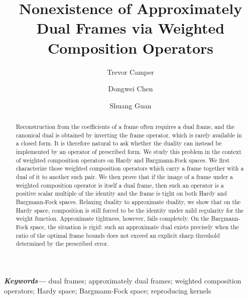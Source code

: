 \documentclass{amsart}
\providecommand{\keywords}[1]{%
  \small
  \textbf{\textit{Keywords---}} #1
}
\theoremstyle{definition}
\theoremstyle{remark}
\numberwithin{equation}{section}
\begin{document}
\title[Nonexistence of Dual Frames]{Nonexistence of Approximately Dual Frames via Weighted Composition Operators}


\author{Trevor Camper}
\address{Department of Mathematics, Dartmouth College,
Hanover, NH, USA, 03755}


\author{Dongwei Chen}
\address{Department of Mathematics and Statistical Science, University of Idaho, Moscow, ID, USA, 83844}

\author{Shuang Guan}
\address{School of Mathematics, Georgia Institute of Technology, Atlanta, GA, USA, 30332}


\begin{abstract}
    Reconstruction from the coefficients of a frame often requires a dual frame, and the canonical dual is obtained by inverting the frame operator, which is rarely available in a closed form.  It is therefore natural to ask whether the duality can instead be implemented by an operator of prescribed form. We study this problem in the context of weighted composition operators on Hardy and Bargmann-Fock spaces. We first characterize those weighted composition operators which carry a frame together with a dual of it to another such pair.  We then prove that if the image of a frame under a weighted composition operator is itself a dual frame, then such an operator is a positive scalar multiple of the identity and the frame is tight on both Hardy and Bargmann-Fock spaces. Relaxing duality to approximate duality, we show that on the Hardy space, composition is still forced to be the identity under mild regularity for the weight function. Approximate tightness, however, fails completely.  On the Bargmann-Fock space, the situation is rigid: such an approximate dual exists precisely when the ratio of the optimal frame bounds does not exceed an explicit sharp threshold determined by the prescribed error.
\end{abstract}



\keywords{dual frames; approximately dual frames; weighted composition operators; Hardy space; Bargmann-Fock space; reproducing kernels}





\maketitle
\end{document}
